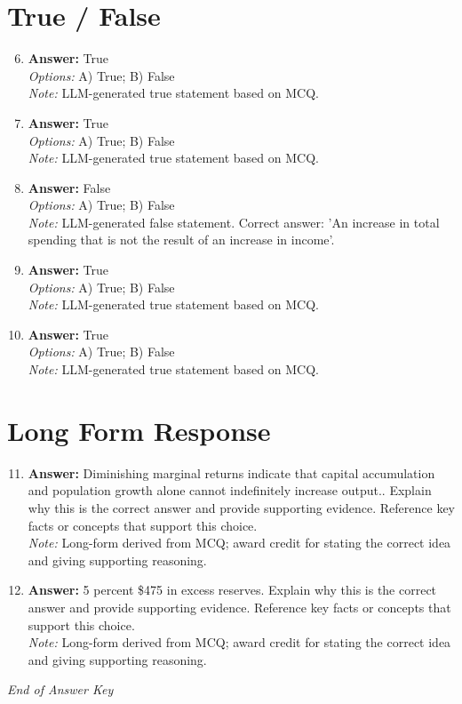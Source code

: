 \documentclass[12pt]{article}
\begin{document}
\section*{True / False}
\begin{enumerate}[label=\arabic*.]
\setcounter{enumi}{5}
\item \textbf{Answer:} True
\\ \textit{Options:} A) True; B) False
\\ \textit{Note:} LLM-generated true statement based on MCQ.
\item \textbf{Answer:} True
\\ \textit{Options:} A) True; B) False
\\ \textit{Note:} LLM-generated true statement based on MCQ.
\item \textbf{Answer:} False
\\ \textit{Options:} A) True; B) False
\\ \textit{Note:} LLM-generated false statement. Correct answer: 'An increase in total spending that is not the result of an increase in income'.
\item \textbf{Answer:} True
\\ \textit{Options:} A) True; B) False
\\ \textit{Note:} LLM-generated true statement based on MCQ.
\item \textbf{Answer:} True
\\ \textit{Options:} A) True; B) False
\\ \textit{Note:} LLM-generated true statement based on MCQ.
\end{enumerate}

\section*{Long Form Response}
\begin{enumerate}[label=\arabic*.]
\setcounter{enumi}{10}
\item \textbf{Answer:} Diminishing marginal returns indicate that capital accumulation and population growth alone cannot indefinitely increase output.. Explain why this is the correct answer and provide supporting evidence. Reference key facts or concepts that support this choice.
\\ \textit{Note:} Long-form derived from MCQ; award credit for stating the correct idea and giving supporting reasoning.
\item \textbf{Answer:} 5 percent \$475 in excess reserves. Explain why this is the correct answer and provide supporting evidence. Reference key facts or concepts that support this choice.
\\ \textit{Note:} Long-form derived from MCQ; award credit for stating the correct idea and giving supporting reasoning.
\end{enumerate}

\vfill
\noindent\textit{End of Answer Key}
\end{document}
